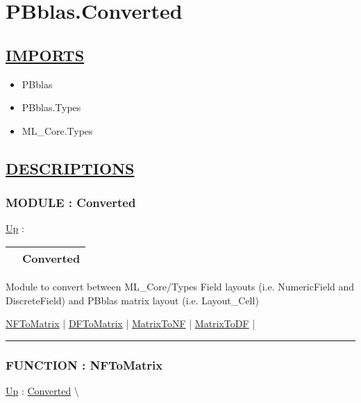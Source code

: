 \chapter*{PBblas.Converted}
\hypertarget{ecldoc:toc:PBblas.Converted}{}

\section*{\underline{IMPORTS}}
\begin{itemize}
\item PBblas
\item PBblas.Types
\item ML\_Core.Types
\end{itemize}

\section*{\underline{DESCRIPTIONS}}
\subsection*{MODULE : Converted}
\hypertarget{ecldoc:PBblas.Converted}{}
\hyperlink{ecldoc:toc:PBblas}{Up} :

{\renewcommand{\arraystretch}{1.5}
\begin{tabularx}{\textwidth}{|>{\raggedright\arraybackslash}l|X|}
\hline
\hspace{0pt} & Converted \\
\hline
\end{tabularx}
}

\par
Module to convert between ML\_Core/Types Field layouts (i.e. NumericField and DiscreteField) and PBblas matrix layout (i.e. Layout\_Cell)


\hyperlink{ecldoc:pbblas.converted.nftomatrix}{NFToMatrix}  |
\hyperlink{ecldoc:pbblas.converted.dftomatrix}{DFToMatrix}  |
\hyperlink{ecldoc:pbblas.converted.matrixtonf}{MatrixToNF}  |
\hyperlink{ecldoc:pbblas.converted.matrixtodf}{MatrixToDF}  |

\rule{\linewidth}{0.5pt}

\subsection*{FUNCTION : NFToMatrix}
\hypertarget{ecldoc:pbblas.converted.nftomatrix}{}
\hyperlink{ecldoc:PBblas.Converted}{Up} :
\hspace{0pt} \hyperlink{ecldoc:PBblas.Converted}{Converted} \textbackslash 


